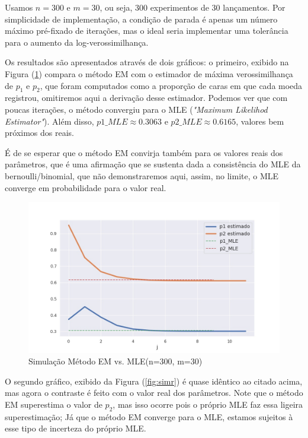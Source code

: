 \documentclass[12pt]{article}
\begin{document}
Usamos $n=300$ e $m=30$, ou seja, 300 experimentos de 30 lançamentos. Por simplicidade de implementação, a condição de parada é apenas um número máximo pré-fixado de iterações, mas o ideal seria implementar uma tolerância para o aumento da log-verossimilhança.

Os resultados são apresentados através de dois gráficos: o primeiro, exibido na Figura (\ref{fig:sim}) compara o método EM com o estimador de máxima verossimilhança de $p_1$ e $p_2$, que foram computados como a proporção de caras em que cada moeda registrou, omitiremos aqui a derivação desse estimador. Podemos ver que com poucas iterações, o método convergiu para o MLE (\textit{"Maximum Likelihod Estimator"}). Além disso, $p1\_MLE\approx 0.3063$ e $p2\_MLE\approx 0.6165$, valores bem próximos dos reais. 

É de se esperar que o método EM convirja também para os valores reais dos parâmetros, que é uma afirmação que se sustenta dada a consistência do MLE da bernoulli/binomial, que não demonstraremos aqui, assim, no limite, o MLE converge em probabilidade para o valor real.

\begin{figure}[!htb]
    \centering
    \includegraphics[scale=0.5]{sim2-MLE.jpg}
    \caption{Simulação Método EM vs. MLE(n=300, m=30)}
    \label{fig:sim}
\end{figure}

O segundo gráfico, exibido da Figura (\ref{fig:simr}) é quase idêntico ao citado acima, mas agora o contraste é feito com o valor real dos parâmetros. Note que o método EM superestima o valor de $p_2$, mas isso ocorre pois o próprio MLE faz essa ligeira superestimação; Já que o método EM converge para o MLE, estamos sujeitos à esse tipo de incerteza do próprio MLE.
\end{document}
